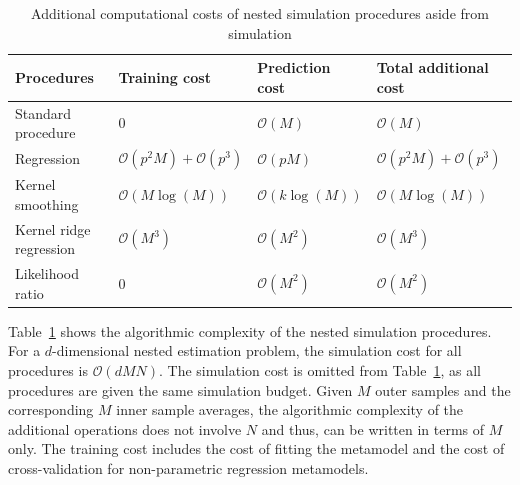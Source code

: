 \begin{table}[ht]
    \centering  
    \small
    \begin{tabular}{llll}
    \hline
    \textbf{Procedures}      & \textbf{Training cost}                    &  \textbf{Prediction cost}    & \textbf{Total additional cost} \\ \hline \hline
    Standard procedure       &  $0$                                      &  $\mathcal{O}(M)$            & $\mathcal{O}(M)$ \\ 
    Regression               &  $\mathcal{O}(p^2M) + \mathcal{O}(p^3)$   &  $\mathcal{O}(pM)$           & $\mathcal{O}(p^2M) + \mathcal{O}(p^3)$ \\
    Kernel smoothing         &  $\mathcal{O}(M\log(M))$                  &  $\mathcal{O}(k\log(M))$     & $\mathcal{O}(M\log(M))$ \\
    Kernel ridge regression  &  $\mathcal{O}(M^3)$                       &  $\mathcal{O}(M^2)$          & $\mathcal{O}(M^3)$ \\
    Likelihood ratio         &  $0$                                      &  $\mathcal{O}(M^2)$          & $\mathcal{O}(M^2)$ \\
    \hline
    \end{tabular} 
    \caption{Additional computational costs of nested simulation procedures aside from simulation}
\label{tab1:complexity}
\end{table}

Table~\ref{tab1:complexity} shows the algorithmic complexity of the nested simulation procedures.
For a $d$-dimensional nested estimation problem, the simulation cost for all procedures is $\mathcal{O}(dMN)$.
The simulation cost is omitted from Table~\ref{tab1:complexity}, as all procedures are given the same simulation budget.
Given $M$ outer samples and the corresponding $M$ inner sample averages, the algorithmic complexity of the additional operations does not involve $N$ and thus, can be written in terms of $M$ only. 
The training cost includes the cost of fitting the metamodel and the cost of cross-validation for non-parametric regression metamodels.

